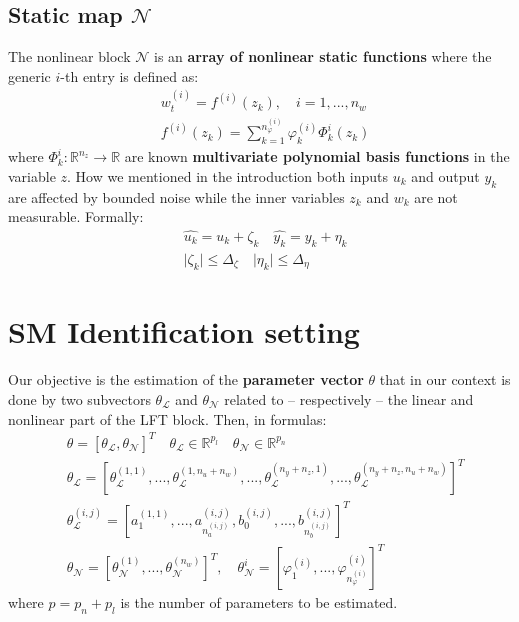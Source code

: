 \subsection{Static map $\mathcal{N}$}
The nonlinear block $\mathcal{N}$ is an \textbf{array of nonlinear static functions} where the generic $i$-th entry is defined as:
\begin{align}
    &w_t^{(i)}=f^{(i)}(z_k), \quad i=1,...,n_w\\
    &f^{(i)}(z_k)=\sum_{k=1}^{n_{\varphi}^{(i)}}{
        \varphi_k^{(i)} \varPhi_k^i(z_k)
    }
\end{align}
where $\varPhi_k^i:\mathbb{R}^{n_z}\to\mathbb{R}$ are known \textbf{multivariate polynomial basis functions} in the variable $z$. How we mentioned in the introduction both inputs $u_k$ and output $y_k$ are affected by bounded noise while the inner variables $z_k$ and $w_k$ are not measurable. Formally:
\begin{align}
    &\hat{u_k}=u_k+\zeta_k \quad \hat{y_k}=y_k+\eta_k \\
    &\vert \zeta_k \vert \le \Delta_\zeta \quad 
    \vert \eta_k \vert \le \Delta_\eta
\end{align}

\section{SM Identification setting}
Our objective is the estimation of the \textbf{parameter vector} $\theta$ that in our context is done by two subvectors $\theta_{\mathcal{L}}$ and $\theta_{\mathcal{N}}$ related to -- respectively -- the linear and nonlinear part of the LFT block. Then, in formulas:
\begin{align}
    &\theta=[\theta_{\mathcal{L}}, \theta_{\mathcal{N}}]^T
    \quad \theta_{\mathcal{L}}\in\mathbb{R}^{p_l} \quad 
    \theta_{\mathcal{N}}\in\mathbb{R}^{p_n}\\
    &\theta_{\mathcal{L}}=[\theta_{\mathcal{L}}^{(1,1)},...,\theta_{\mathcal{L}}^{(1,n_u+n_w)},...,\theta_{\mathcal{L}}^{(n_y+n_z,1)},...,\theta_{\mathcal{L}}^{(n_y+n_z,n_u+n_w)}]^T\\
    &\theta_{\mathcal{L}}^{(i,j)} = [
        a_1^{(1,1)},...,a_{n_a^{(i,j)}}^{(i,j)}, b_0^{(i,j)},...,b_{n_b^{(i,j)}}^{(i,j)}]^T\\
    &\theta_{\mathcal{N}}=[
        \theta_{\mathcal{N}}^{(1)},...,
        \theta_{\mathcal{N}}^{(n_w)}
    ]^T, \quad \theta_{\mathcal{N}}^i=[
        \varphi_1^{(i)},...,\varphi_{n_\varphi^{(i)}}^{(i)}
    ]^T
\end{align}
where $p=p_{n}+p_{l}$ is the number of parameters to be estimated.

